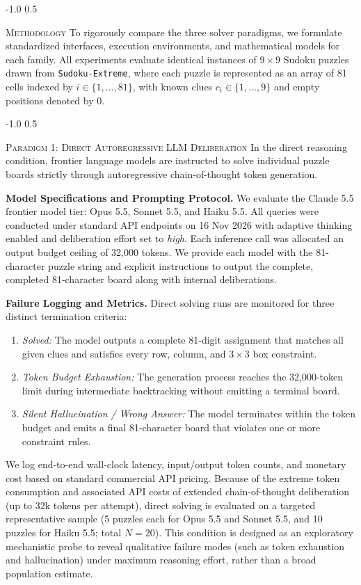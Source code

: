 \documentclass{article} %
\makeatletter
\renewcommand{\section}{\@startsection{section}{1}{\z@}%
  {-1.0\baselineskip}%
  {0.5\baselineskip}%
  {\normalfont\fontsize{12pt}{14pt}\selectfont\scshape\raggedright}}
\renewcommand{\subsection}{\@startsection{subsection}{2}{\z@}%
  {-1.0\baselineskip}%
  {0.5\baselineskip}%
  {\normalfont\fontsize{10pt}{12pt}\selectfont\scshape\raggedright}}
\makeatother
\begin{document}
\section{\textsc{Methodology}}
\label{sec:method}
To rigorously compare the three solver paradigms, we formulate standardized interfaces, execution environments, and mathematical models for each family. All experiments evaluate identical instances of $9 \times 9$ Sudoku puzzles drawn from \texttt{Sudoku-Extreme}, where each puzzle is represented as an array of 81 cells indexed by $i \in \{1, \dots, 81\}$, with known clues $c_i \in \{1, \dots, 9\}$ and empty positions denoted by 0.

\subsection{\textsc{Paradigm 1: Direct Autoregressive LLM Deliberation}}
In the direct reasoning condition, frontier language models are instructed to solve individual puzzle boards strictly through autoregressive chain-of-thought token generation.

\textbf{Model Specifications and Prompting Protocol.} We evaluate the Claude 5.5 frontier model tier: Opus 5.5, Sonnet 5.5, and Haiku 5.5. All queries were conducted under standard API endpoints on 16 Nov 2026 with adaptive thinking enabled and deliberation effort set to \textit{high}. Each inference call was allocated an output budget ceiling of 32,000 tokens. We provide each model with the 81-character puzzle string and explicit instructions to output the complete, completed 81-character board along with internal deliberations.

\textbf{Failure Logging and Metrics.} Direct solving runs are monitored for three distinct termination criteria:
\begin{enumerate}
    \item \textit{Solved:} The model outputs a complete 81-digit assignment that matches all given clues and satisfies every row, column, and $3 \times 3$ box constraint.
    \item \textit{Token Budget Exhaustion:} The generation process reaches the 32,000-token limit during intermediate backtracking without emitting a terminal board.
    \item \textit{Silent Hallucination / Wrong Answer:} The model terminates within the token budget and emits a final 81-character board that violates one or more constraint rules.
\end{enumerate}
We log end-to-end wall-clock latency, input/output token counts, and monetary cost based on standard commercial API pricing. Because of the extreme token consumption and associated API costs of extended chain-of-thought deliberation (up to 32k tokens per attempt), direct solving is evaluated on a targeted representative sample (5 puzzles each for Opus 5.5 and Sonnet 5.5, and 10 puzzles for Haiku 5.5; total $N=20$). This condition is designed as an exploratory mechanistic probe to reveal qualitative failure modes (such as token exhaustion and hallucination) under maximum reasoning effort, rather than a broad population estimate.
\end{document}
